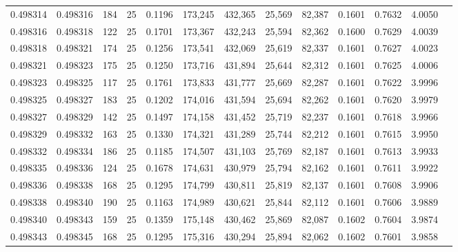 \begin{tabular}{rrrrrrrrrrrrr}
0.498314 & 0.498316 & 184 &  25 &                                     0.1196 & 173,245 & 432,365 &  25,569 &  82,387 & 0.1601 & 0.7632 & 4.0050 \\
0.498316 & 0.498318 & 122 &  25 &                                     0.1701 & 173,367 & 432,243 &  25,594 &  82,362 & 0.1600 & 0.7629 & 4.0039 \\
0.498318 & 0.498321 & 174 &  25 &                                     0.1256 & 173,541 & 432,069 &  25,619 &  82,337 & 0.1601 & 0.7627 & 4.0023 \\
0.498321 & 0.498323 & 175 &  25 &                                     0.1250 & 173,716 & 431,894 &  25,644 &  82,312 & 0.1601 & 0.7625 & 4.0006 \\
0.498323 & 0.498325 & 117 &  25 &                                     0.1761 & 173,833 & 431,777 &  25,669 &  82,287 & 0.1601 & 0.7622 & 3.9996 \\
0.498325 & 0.498327 & 183 &  25 &                                     0.1202 & 174,016 & 431,594 &  25,694 &  82,262 & 0.1601 & 0.7620 & 3.9979 \\
0.498327 & 0.498329 & 142 &  25 &                                     0.1497 & 174,158 & 431,452 &  25,719 &  82,237 & 0.1601 & 0.7618 & 3.9966 \\
0.498329 & 0.498332 & 163 &  25 &                                     0.1330 & 174,321 & 431,289 &  25,744 &  82,212 & 0.1601 & 0.7615 & 3.9950 \\
0.498332 & 0.498334 & 186 &  25 &                                     0.1185 & 174,507 & 431,103 &  25,769 &  82,187 & 0.1601 & 0.7613 & 3.9933 \\
0.498335 & 0.498336 & 124 &  25 &                                     0.1678 & 174,631 & 430,979 &  25,794 &  82,162 & 0.1601 & 0.7611 & 3.9922 \\
0.498336 & 0.498338 & 168 &  25 &                                     0.1295 & 174,799 & 430,811 &  25,819 &  82,137 & 0.1601 & 0.7608 & 3.9906 \\
0.498338 & 0.498340 & 190 &  25 &                                     0.1163 & 174,989 & 430,621 &  25,844 &  82,112 & 0.1601 & 0.7606 & 3.9889 \\
0.498340 & 0.498343 & 159 &  25 &                                     0.1359 & 175,148 & 430,462 &  25,869 &  82,087 & 0.1602 & 0.7604 & 3.9874 \\
0.498343 & 0.498345 & 168 &  25 &                                     0.1295 & 175,316 & 430,294 &  25,894 &  82,062 & 0.1602 & 0.7601 & 3.9858 \\

\end{tabular}
